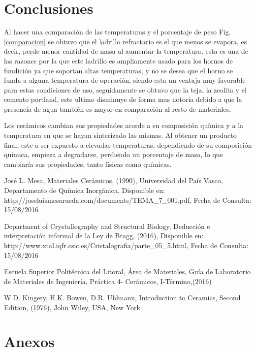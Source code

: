 \documentclass[a4paper, 11pt]{article}
\begin{document}
\section{Conclusiones}

Al hacer una comparación de las temperaturas y el porcentaje de peso Fig. \ref{comparacion} se obtuvo que el ladrillo refractario es el que menos se evapora, es decir, perde menor cantidad de masa al aumentar la temperatura, esta es una de las razones por la que este ladrillo es ampliamente usado para los hornos de fundición ya que soportan altas temperaturas, y no se desea que el horno se funda a alguna temperatura de operación, siendo esta un ventaja muy favorable para estas condiciones de uso, seguidamente se obtuvo que la teja, la zeolita y el cemento portland, este ultimo disminuye de forma mas notoria debido a que la presencia de agua también es mayor en comparación al resto de materiales.

Los cerámicos cambian sus propiedades acorde a su composición química y a la temperatura en que se hayan sinterizado las mismas.
Al obtener un producto final, este a ser expuesto a elevadas temperaturas, dependiendo de su composición química, empieza a degradarse, perdiendo un porcentaje de masa, lo que cambiaría sus propiedades, tanto físicas como químicas.


\begin{thebibliography}{9}

José L. Mesa, Materiales Cerámicos, (1990), Universidad del País Vasco, Departamento de Química Inorgánica, Disponible en: http://joseluismesarueda.com/documents/TEMA\_7\_001.pdf, Fecha de Consulta: 15/08/2016

Department of Crystallography and Structural Biology, Deducción e interpretación informal de la Ley de Bragg, (2016), Disponible en: http://www.xtal.iqfr.csic.es/Cristalografia/parte\_05\_5.html, Fecha de Consulta: 15/08/2016

Escuela Superior Politécnica del Litoral, Área de Materiales, Guía de Laboratorio de Materiales de Ingeniería, Práctica 4- Cerámicos, I-Término,(2016)


W.D. Kingery, H.K. Bowen, D.R. Uhlmann, Introduction to Ceramics, Second Edition, (1976), John Wiley, USA, New York

\end{thebibliography}
\newpage      

\section{Anexos}
\end{document}
